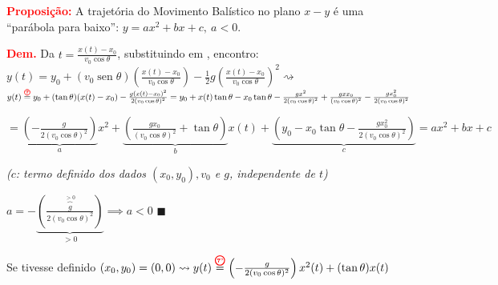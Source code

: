 \documentclass{beamer}
\begin{document}
	\begin{frame}
		\scriptsize
		
	
		\textcolor{red}{\textbf{Proposição:}} A trajetória do Movimento Balístico no plano $x-y$ é uma ``parábola para baixo'': $y = ax^2 + bx + c, \ a < 0$.
	
		
		
		\vspace{0.2cm}
		\textcolor{red}{\textbf{Dem.}} Da  $t = \frac{x(t) - x_0}{v_0 \cos \theta}$, substituindo em , encontro: 
		$y(t) = y_0 + (v_0 \operatorname{sen} \theta) \left( \frac{x(t) - x_0}{v_0 \cos \theta} \right) - \frac{1}{2} g \left( \frac{x(t) - x_0}{v_0 \cos \theta} \right)^2 \rightsquigarrow $\\
		$y(t) \overset{\circled{7}}{=} y_0 + (\tan \theta)(x(t) - x_0) - \frac{g(x(t) - x_0)^2}{2(v_0 \cos \theta)^2}= y_0 + x(t) \tan \theta - x_0 \tan \theta - \frac{g x^2}{2(v_0 \cos \theta)^2} + \frac{g x x_0}{(v_0 \cos \theta)^2} - \frac{g x_0^2}{2(v_0 \cos \theta)^2}$
		
		\vspace{0.2cm}
		$= \underbrace{\left( - \frac{g}{2(v_0 \cos \theta)^2} \right)}_{a} x^2 + \underbrace{\left( \frac{g x_0}{(v_0 \cos \theta)^2} + \tan \theta \right)}_{b} x(t) + \underbrace{\left( y_0 - x_0 \tan \theta - \frac{g x_0^2}{2(v_0 \cos \theta)^2} \right)}_{c} = ax^2 + bx + c$
		
		\vspace{0.1cm}
		\hfill \textit{\tiny ($c$: termo definido dos dados $(x_0, y_0), v_0$ e $g$, independente de $t$)}
		
		
		$a = - \underbrace{\left( \frac{\overbrace{g}^{>0}}{2(v_0 \cos \theta)^2} \right)}_{>0} \implies a < 0$ \hfill $\blacksquare$
		
		
		Se tivesse definido $(x_0, y_0) = (0,0) \rightsquigarrow y(t) \overset{\circled{7'}}{=} \left( - \frac{g}{2(v_0 \cos \theta)^2} \right) x^2(t) + (\tan \theta) x(t)$
		
	\end{frame}
	
\end{document}
